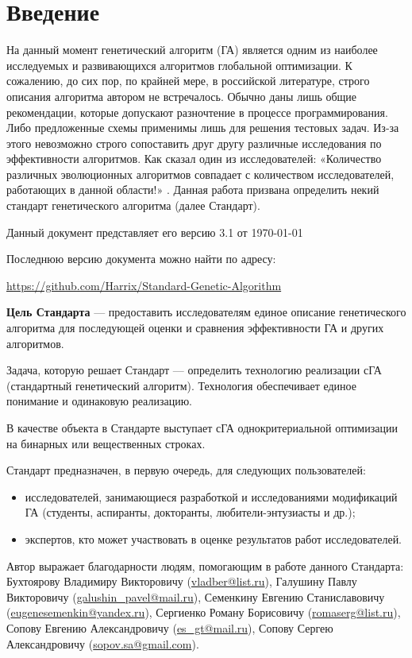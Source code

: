 \chapter*{Введение}

На данный момент генетический алгоритм (ГА) является одним из наиболее исследуемых и развивающихся алгоритмов глобальной оптимизации. К сожалению, до сих пор, по крайней мере, в российской литературе, строго описания алгоритма автором не встречалось. Обычно даны лишь общие рекомендации, которые допускают разночтение в процессе программирования. Либо предложенные схемы применимы лишь для решения тестовых задач. Из-за этого невозможно строго сопоставить друг другу различные исследования по эффективности алгоритмов. Как сказал один из исследователей: «Количество различных эволюционных алгоритмов совпадает с количеством исследователей, работающих в данной области!» \cite{web:makeingsimpleGA}. Данная работа призвана определить некий стандарт генетического алгоритма (далее Стандарт).

Данный документ представляет его версию 3.1 от \today

Последнюю версию документа можно найти по адресу:

\href{https://github.com/Harrix/Standard-Genetic-Algorithm}{https://github.com/Harrix/Standard-Genetic-Algorithm}

\textbf{Цель Стандарта} --- предоставить исследователям единое описание генетического алгоритма для последующей оценки и сравнения эффективности ГА и других алгоритмов. 

Задача, которую решает Стандарт --- определить технологию реализации сГА (стандартный генетический алгоритм). Технология обеспечивает единое понимание и одинаковую реализацию.

В качестве объекта в Стандарте выступает сГА однокритериальной оптимизации на бинарных или вещественных строках.

Стандарт предназначен, в первую очередь, для следующих пользователей:
\begin{itemize}
\item исследователей, занимающиеся  разработкой и исследованиями модификаций ГА (студенты, аспиранты, докторанты, любители-энтузиасты и др.);
\item экспертов, кто может участвовать в оценке результатов работ исследователей.
\end{itemize}


Автор выражает благодарности людям, помогающим в работе данного Стандарта: Бухтоярову Владимиру Викторовичу (\href{mailto:vladber@list.ru}{vladber@list.ru}), Галушину Павлу Викторовичу (\href{mailto:galushin\_pavel@mail.ru}{galushin\_pavel@mail.ru}), Семенкину Евгению Станиславовичу (\href{mailto:eugenesemenkin@yandex.ru}{eugenesemenkin@yandex.ru}), Сергиенко Роману Борисовичу (\href{mailto:romaserg@list.ru}{romaserg@list.ru}), Сопову Евгению Александровичу (\href{mailto:es\_gt@mail.ru}{es\_gt@mail.ru}), Сопову Сергею Александровичу (\href{mailto:sopov.sa@gmail.com}{sopov.sa@gmail.com}).

